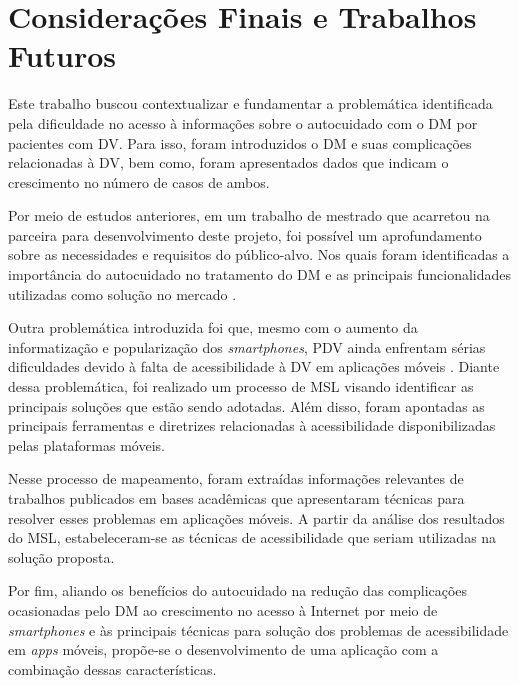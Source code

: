 \chapter{Considerações Finais e Trabalhos Futuros}
\label{ch:conclusion}

Este trabalho buscou contextualizar e fundamentar a problemática identificada pela dificuldade
no acesso à informações sobre o autocuidado com o DM por pacientes com DV\@. Para isso, foram introduzidos
o DM e suas complicações relacionadas à DV, bem como, foram apresentados dados que indicam o crescimento no
número de casos de ambos.

Por meio de estudos anteriores, em um trabalho de mestrado que acarretou na parceira para desenvolvimento deste
projeto, foi possível um aprofundamento sobre as necessidades e requisitos do público-alvo.
Nos quais foram identificadas a importância do autocuidado no tratamento do DM e as principais funcionalidades utilizadas
como solução no mercado \cite{Sobral2021}.

Outra problemática introduzida foi que, mesmo com o aumento da informatização e popularização dos \emph{smartphones},
PDV ainda enfrentam sérias dificuldades devido à falta de acessibilidade à DV em aplicações móveis \cite{Shera2021285}.
Diante dessa problemática, foi realizado um processo de MSL visando identificar as principais soluções que estão sendo adotadas.
Além disso, foram apontadas as principais ferramentas e diretrizes relacionadas à acessibilidade disponibilizadas pelas
plataformas móveis.

Nesse processo de mapeamento, foram extraídas informações relevantes
de trabalhos publicados em bases acadêmicas que apresentaram técnicas para resolver esses problemas
em aplicações móveis.
A partir da análise dos resultados do MSL, estabeleceram-se as técnicas de acessibilidade que seriam utilizadas
na solução proposta.

Por fim, aliando os benefícios do autocuidado na redução das complicações ocasionadas pelo DM
\cite{ADA2019} ao crescimento no acesso à Internet por meio de \emph{smartphones} \cite{CETIC_2021}
e às principais técnicas para solução dos problemas de acessibilidade em \emph{apps} móveis,
propõe-se o desenvolvimento de uma aplicação com a combinação dessas características.